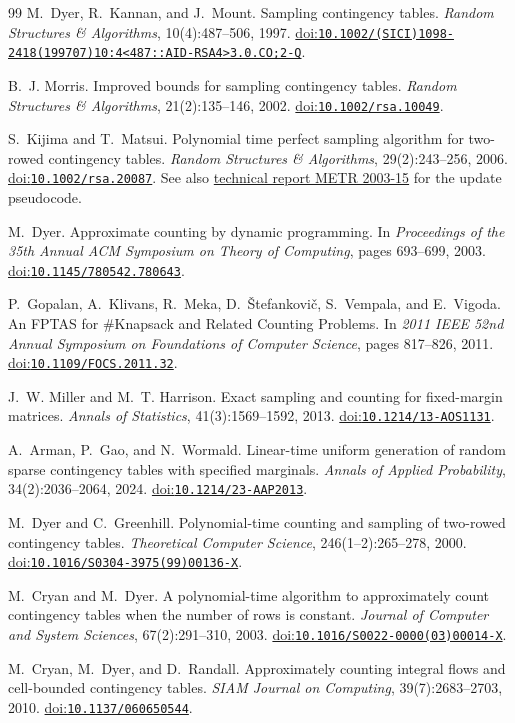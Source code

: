\documentclass[11pt]{article}
\newcommand{\doi}[1]{\href{https://doi.org/#1}{doi:\nolinkurl{#1}}}
\begin{document}
\begin{thebibliography}{99}
M.~Dyer, R.~Kannan, and J.~Mount.
Sampling contingency tables.
\emph{Random Structures \& Algorithms}, 10(4):487--506, 1997.
\doi{10.1002/(SICI)1098-2418(199707)10:4<487::AID-RSA4>3.0.CO;2-Q}.

B.~J. Morris.
Improved bounds for sampling contingency tables.
\emph{Random Structures \& Algorithms}, 21(2):135--146, 2002.
\doi{10.1002/rsa.10049}.

S.~Kijima and T.~Matsui.
Polynomial time perfect sampling algorithm for two-rowed contingency tables.
\emph{Random Structures \& Algorithms}, 29(2):243--256, 2006.
\doi{10.1002/rsa.20087}.
See also \href{https://www.keisu.t.u-tokyo.ac.jp/data/2003/METR03-15.pdf}{technical report METR 2003-15} for the update pseudocode.

M.~Dyer.
Approximate counting by dynamic programming.
In \emph{Proceedings of the 35th Annual ACM Symposium on Theory of Computing},
pages 693--699, 2003.
\doi{10.1145/780542.780643}.

P.~Gopalan, A.~Klivans, R.~Meka, D.~\v{S}tefankovi\v{c}, S.~Vempala, and E.~Vigoda.
An FPTAS for \#Knapsack and Related Counting Problems.
In \emph{2011 IEEE 52nd Annual Symposium on Foundations of Computer Science},
pages 817--826, 2011.
\doi{10.1109/FOCS.2011.32}.

J.~W. Miller and M.~T. Harrison.
Exact sampling and counting for fixed-margin matrices.
\emph{Annals of Statistics}, 41(3):1569--1592, 2013.
\doi{10.1214/13-AOS1131}.

A.~Arman, P.~Gao, and N.~Wormald.
Linear-time uniform generation of random sparse contingency tables with specified marginals.
\emph{Annals of Applied Probability}, 34(2):2036--2064, 2024.
\doi{10.1214/23-AAP2013}.

M.~Dyer and C.~Greenhill.
Polynomial-time counting and sampling of two-rowed contingency tables.
\emph{Theoretical Computer Science}, 246(1--2):265--278, 2000.
\doi{10.1016/S0304-3975(99)00136-X}.

M.~Cryan and M.~Dyer.
A polynomial-time algorithm to approximately count contingency tables when the number of rows is constant.
\emph{Journal of Computer and System Sciences}, 67(2):291--310, 2003.
\doi{10.1016/S0022-0000(03)00014-X}.

M.~Cryan, M.~Dyer, and D.~Randall.
Approximately counting integral flows and cell-bounded contingency tables.
\emph{SIAM Journal on Computing}, 39(7):2683--2703, 2010.
\doi{10.1137/060650544}.


\end{thebibliography}
\end{document}
